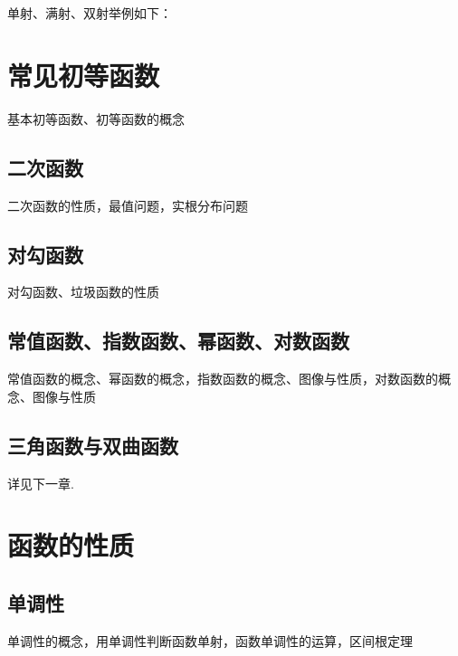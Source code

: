 \documentclass[lang=cn, zihao=4.5]{elegantbook}
\begin{document}
单射、满射、双射举例如下：



\section{常见初等函数}


基本初等函数、初等函数的概念

\subsection{二次函数}

二次函数的性质，最值问题，实根分布问题

\subsection{对勾函数}

对勾函数、垃圾函数的性质

\subsection{常值函数、指数函数、幂函数、对数函数}

常值函数的概念、幂函数的概念，指数函数的概念、图像与性质，对数函数的概念、图像与性质

\subsection{三角函数与双曲函数}

详见下一章.

\section{函数的性质}

\subsection{单调性}

单调性的概念，用单调性判断函数单射，函数单调性的运算，区间根定理
\end{document}
